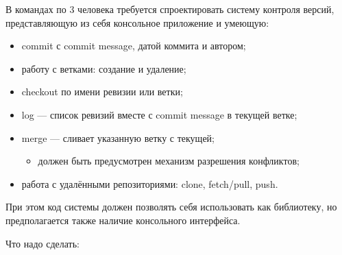 \documentclass[a5paper]{homework}
\begin{document}

В командах по 3 человека требуется спроектировать систему контроля версий, представляющую из себя консольное приложение и умеющую:

\begin{itemize}
    \item commit с commit message, датой коммита и автором;
    \item работу с ветками: создание и удаление;
    \item checkout по имени ревизии или ветки;
    \item log --- список ревизий вместе с commit message в текущей ветке;
    \item merge --- сливает указанную ветку с текущей;
    \begin{itemize}
        \item должен быть предусмотрен механизм разрешения конфликтов;
    \end{itemize}
    \item работа с удалёнными репозиториями: clone, fetch/pull, push.
\end{itemize}

При этом код системы должен позволять себя использовать как библиотеку, но предполагается также наличие консольного интерфейса.

Что надо сделать:
\end{document}
